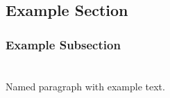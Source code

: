 \subsection{Example Section}

\subsubsection{Example Subsection}

\paragraph{} \mbox{} \\
Named paragraph with example text.